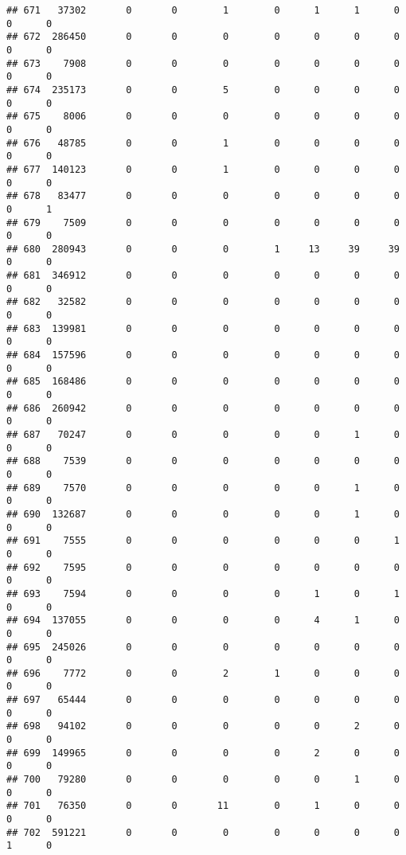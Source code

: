 \documentclass[
]{article}
\begin{document}
\begin{verbatim}
## 671   37302       0       0        1        0      1      1      0     0      0
## 672  286450       0       0        0        0      0      0      0     0      0
## 673    7908       0       0        0        0      0      0      0     0      0
## 674  235173       0       0        5        0      0      0      0     0      0
## 675    8006       0       0        0        0      0      0      0     0      0
## 676   48785       0       0        1        0      0      0      0     0      0
## 677  140123       0       0        1        0      0      0      0     0      0
## 678   83477       0       0        0        0      0      0      0     0      1
## 679    7509       0       0        0        0      0      0      0     0      0
## 680  280943       0       0        0        1     13     39     39     0      0
## 681  346912       0       0        0        0      0      0      0     0      0
## 682   32582       0       0        0        0      0      0      0     0      0
## 683  139981       0       0        0        0      0      0      0     0      0
## 684  157596       0       0        0        0      0      0      0     0      0
## 685  168486       0       0        0        0      0      0      0     0      0
## 686  260942       0       0        0        0      0      0      0     0      0
## 687   70247       0       0        0        0      0      1      0     0      0
## 688    7539       0       0        0        0      0      0      0     0      0
## 689    7570       0       0        0        0      0      1      0     0      0
## 690  132687       0       0        0        0      0      1      0     0      0
## 691    7555       0       0        0        0      0      0      1     0      0
## 692    7595       0       0        0        0      0      0      0     0      0
## 693    7594       0       0        0        0      1      0      1     0      0
## 694  137055       0       0        0        0      4      1      0     0      0
## 695  245026       0       0        0        0      0      0      0     0      0
## 696    7772       0       0        2        1      0      0      0     0      0
## 697   65444       0       0        0        0      0      0      0     0      0
## 698   94102       0       0        0        0      0      2      0     0      0
## 699  149965       0       0        0        0      2      0      0     0      0
## 700   79280       0       0        0        0      0      1      0     0      0
## 701   76350       0       0       11        0      1      0      0     0      0
## 702  591221       0       0        0        0      0      0      0     1      0

\end{verbatim}
\end{document}
